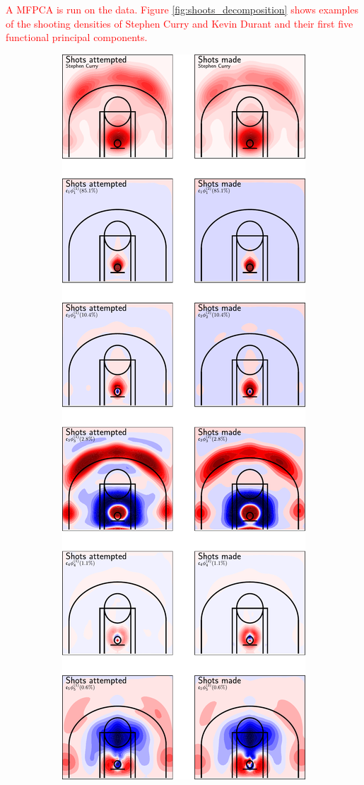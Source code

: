 \textcolor{red}{A MFPCA is run on the data. Figure \ref{fig:shoots_decomposition} shows examples of the shooting densities of Stephen Curry and Kevin Durant and their first five functional principal components.}
\begin{figure}
    \centering
    \begin{subfigure}[b]{0.4\textwidth}
        \centering
        \includegraphics[width=\textwidth]{figures/curry_decomposition.pdf}

\end{subfigure}
\end{figure}

